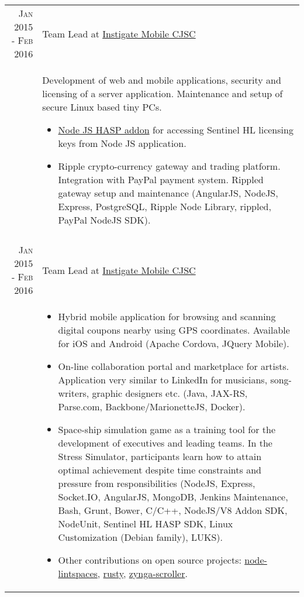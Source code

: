 \documentclass[a4paper,10pt]{article}
\begin{document}

\begin{tabular}{r|p{11cm}}


\textsc{Jan 2015 - Feb 2016}
  & Team Lead at
    \href{http://www.instigatemobile.com/}{Instigate Mobile CJSC} \\

& \footnotesize{ Development of web and mobile applications, security and
licensing of a server application. Maintenance and setup of secure Linux based
tiny PCs.
  \begin{itemize}
    \item \href{https://github.com/vahe-evoyan/node-hasp/releases}
      {Node JS HASP addon} for accessing Sentinel HL licensing keys from
      Node JS application.
    \item Ripple crypto-currency gateway and trading platform. Integration
    with PayPal payment system. Rippled gateway setup and maintenance
    (AngularJS, NodeJS, Express, PostgreSQL, Ripple Node Library, rippled,
    PayPal NodeJS SDK).
  \end{itemize}
} \\


\multicolumn{2}{c}{} \\


\textsc{Jan 2015 - Feb 2016}
  & Team Lead at
    \href{http://www.instigatemobile.com/}{Instigate Mobile CJSC} \\

& \footnotesize{
  \begin{itemize}
    \item Hybrid mobile application for browsing and scanning digital coupons
    nearby using GPS coordinates. Available for iOS and Android (Apache
    Cordova, JQuery Mobile).
    \item On-line collaboration portal and marketplace for artists.
    Application very similar to LinkedIn for musicians, song-writers, graphic
    designers etc. (Java, JAX-RS, Parse.com, Backbone/MarionetteJS, Docker).
    \item Space-ship simulation game as a training tool for the development of
    executives and leading teams. In the Stress Simulator, participants learn
    how to attain optimal achievement despite time constraints and pressure
    from responsibilities (NodeJS, Express, Socket.IO, AngularJS, MongoDB, Jenkins Maintenance, Bash, Grunt, Bower, C/C++, NodeJS/V8 Addon SDK, NodeUnit, Sentinel HL HASP SDK, Linux Customization (Debian family), LUKS).
    \item Other contributions on open source projects:
      \href{https://github.com/vahe-evoyan/node-lintspaces}{node-lintspaces},
      \href{https://github.com/InstigateMobileCJSC/rusty}{rusty},
      \href{https://github.com/InstigateMobileCJSC/scroller}{zynga-scroller}.
  \end{itemize}
} \\



\end{tabular}
\end{document}
